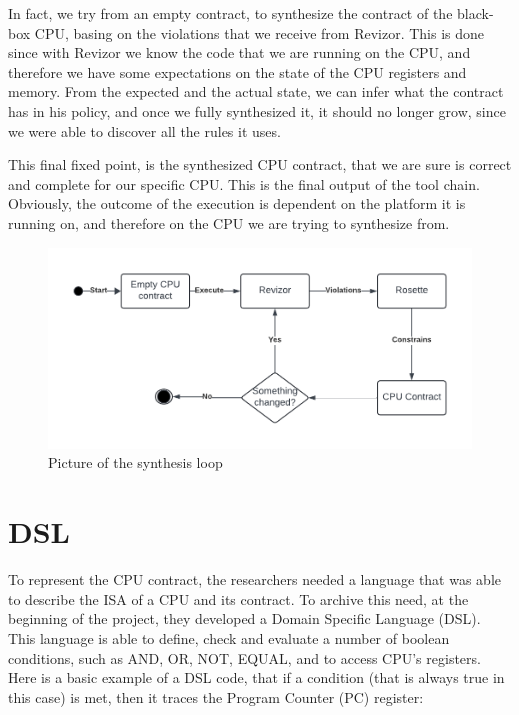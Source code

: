 In fact, we try from an empty contract, to synthesize the contract of the black-box
CPU, basing on the violations that we receive from Revizor. This is done since with
Revizor we know the code that we are running on the CPU, and therefore we have
some expectations on the state of the CPU registers and memory. From the expected
and the actual state, we can infer what the contract has in his policy, and once
we fully synthesized it, it should no longer grow, since we were able to discover
all the rules it uses.

This final fixed point, is the synthesized CPU contract, that we are sure is correct
and complete for our specific CPU. This is the final output of the tool chain. Obviously,
the outcome of the execution is dependent on the platform it is running on, and therefore
on the CPU we are trying to synthesize from.

\begin{figure}
  \begin{center}
    \includegraphics{images/Thesis.png}
  \end{center}
  \caption{Picture of the synthesis loop}
  \label{loop}
\end{figure}
\section{DSL}
\label{cha:DSL} To represent the CPU contract, the researchers needed a language
that was able to describe the ISA of a CPU and its contract. To archive this need,
at the beginning of the project, they developed a Domain Specific Language (DSL).
This language is able to define, check and evaluate a number of boolean conditions,
such as AND, OR, NOT, EQUAL, and to access CPU's registers. Here is a basic example
of a DSL code, that if a condition (that is always true in this case) is met, then
it traces the Program Counter (PC) register:

